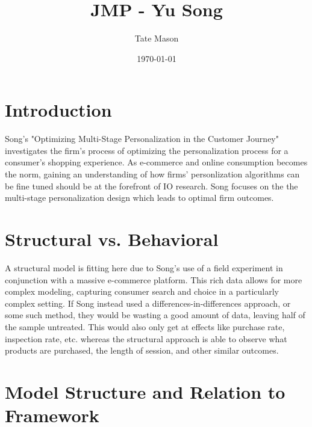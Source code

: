 \documentclass[11pt]{article}
\title{JMP - Yu Song}
\author{Tate Mason}
\date{\today}
\theoremstyle{definition}
\theoremstyle{remark}
\begin{document}
\maketitle
\thispagestyle{empty}


\newpage
\setcounter{page}{1}

\section{Introduction}

Song's "Optimizing Multi-Stage Personalization in the Customer Journey" investigates the firm's
process of optimizing the personalization process for a consumer's shopping experience. As e-commerce
and online consumption becomes the norm, gaining an understanding of how firms' personlization algorithms
can be fine tuned should be at the forefront of IO research. Song focuses on the the multi-stage personalization design
which leads to optimal firm outcomes.

\section{Structural vs. Behavioral}

A structural model is fitting here due to Song's use of a field experiment in conjunction with a massive e-commerce platform. This rich data allows for 
more complex modeling, capturing consumer search and choice in a particularly complex setting. If Song instead used a differences-in-differences approach,
or some such method, they would be wasting a good amount of data, leaving half of the sample untreated. This would also only get at effects like purchase rate,
inspection rate, etc. whereas the structural approach is able to observe what products are purchased, the length of session, and other similar outcomes.

\section{Model Structure and Relation to Framework}
\end{document}
